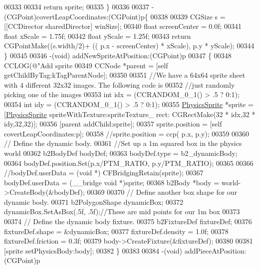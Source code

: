 \begin{DoxyCode}
{{{{{{00333     
00334     \textcolor{keywordflow}{return} sprite;
00335 \}
00336 
00337 - (CGPoint)covertLeapCoordinates:(CGPoint)p\{
00338 
00339     CGSize s = [[CCDirector sharedDirector] winSize];
00340     \textcolor{keywordtype}{float} screenCenter = 0.0f;
00341     \textcolor{keywordtype}{float} xScale = 1.75f;
00342     \textcolor{keywordtype}{float} yScale = 1.25f;
00343     \textcolor{keywordflow}{return} CGPointMake((s.width/2)+ (( p.x - screenCenter) * xScale), p.y * yScale);
00344 \}
00345 
00346 -(void) addNewSpriteAtPosition:(CGPoint)p
00347 \{
00348     CCLOG(\textcolor{stringliteral}{@"Add sprite %
00349     CCNode *parent = [\textcolor{keyword}{self} getChildByTag:kTagParentNode];
00350     
00351     \textcolor{comment}{//We have a 64x64 sprite sheet with 4 different 32x32 images.  The following code is}
00352     \textcolor{comment}{//just randomly picking one of the images}
00353     \textcolor{keywordtype}{int} idx = (CCRANDOM\_0\_1() > .5 ? 0:1);
00354     \textcolor{keywordtype}{int} idy = (CCRANDOM\_0\_1() > .5 ? 0:1);
00355     \hyperlink{interface_physics_sprite}{PhysicsSprite} *sprite = [\hyperlink{interface_physics_sprite}{PhysicsSprite} spriteWithTexture:spriteTexture\_ rect:
      CGRectMake(32 * idx,32 * idy,32,32)];                        
00356     [parent addChild:sprite];
00357     sprite.position = [\textcolor{keyword}{self} covertLeapCoordinates:p];
00358     \textcolor{comment}{//sprite.position = ccp( p.x, p.y);}
00359     
00360     \textcolor{comment}{// Define the dynamic body.}
00361     \textcolor{comment}{//Set up a 1m squared box in the physics world}
00362     b2BodyDef bodyDef;
00363     bodyDef.type = b2\_dynamicBody;
00364     bodyDef.position.Set(p.x/PTM\_RATIO, p.y/PTM\_RATIO);
00365 
00366     \textcolor{comment}{//bodyDef.userData  = (void *) CFBridgingRetain(sprite);}
00367     bodyDef.userData  = (\_\_bridge \textcolor{keywordtype}{void} *)sprite;
00368     b2Body *body = world->CreateBody(&bodyDef);
00369     
00370     \textcolor{comment}{// Define another box shape for our dynamic body.}
00371     b2PolygonShape dynamicBox;
00372     dynamicBox.SetAsBox(.5f, .5f);\textcolor{comment}{//These are mid points for our 1m box}
00373     
00374     \textcolor{comment}{// Define the dynamic body fixture.}
00375     b2FixtureDef fixtureDef;
00376     fixtureDef.shape = &dynamicBox; 
00377     fixtureDef.density = 1.0f;
00378     fixtureDef.friction = 0.3f;
00379     body->CreateFixture(&fixtureDef);
00380     
00381     [sprite setPhysicsBody:body];
00382 \}
00383 
00384 -(void) addPieceAtPosition:(CGPoint)p
}}}}}}}
\end{DoxyCode}
